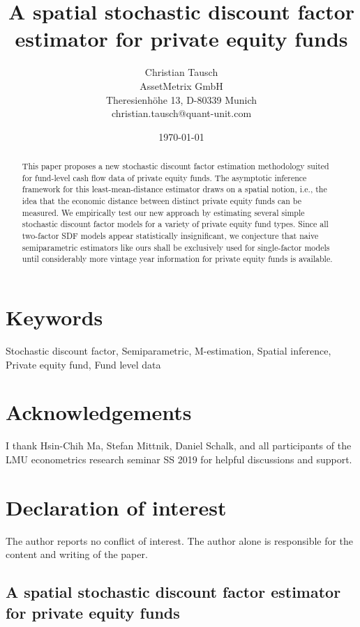 \documentclass[12pt]{article}
\title{A spatial stochastic discount factor estimator for private equity funds}
\author{
	Christian Tausch  \\
	AssetMetrix GmbH  \\
	Theresienh\"{o}he 13, D-80339 Munich \\
	christian.tausch@quant-unit.com \\
	}
\date{\today}
\begin{document}
\maketitle


\section*{Keywords}
Stochastic discount factor, Semiparametric, M-estimation, Spatial inference, Private equity fund, Fund level data


\section*{Acknowledgements}
I thank Hsin-Chih Ma, Stefan Mittnik, Daniel Schalk, and all participants of the LMU econometrics research seminar SS 2019 for helpful discussions and support.


\section*{Declaration of interest}
The author reports no conflict of interest. 
The author alone is responsible for the content and writing of the paper.


\newpage

\begin{center} 
\section*{A spatial stochastic discount factor estimator for private equity funds}
\end{center}



\begin{abstract}
This paper proposes a new stochastic discount factor estimation methodology suited for fund-level cash flow data of private equity funds.
The asymptotic inference framework for this least-mean-distance estimator draws on a spatial notion, i.e., the idea that the economic distance between distinct private equity funds can be measured.
We empirically test our new approach by estimating several simple stochastic discount factor models for a variety of private equity fund types.
Since all two-factor SDF models appear statistically insignificant, we conjecture that naive semiparametric estimators like ours shall be exclusively used for single-factor models until considerably more vintage year information for private equity funds is available.
\end{abstract}
\end{document}
